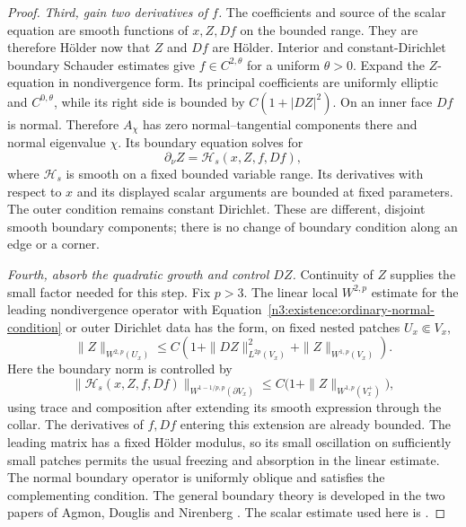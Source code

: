 \begin{proof}
\emph{Third, gain two derivatives of $f$.}
The coefficients and source of the scalar equation are smooth
functions of $x,Z,Df$ on the bounded range. They are therefore
H\"older now that $Z$ and $Df$ are H\"older.  Interior and constant-Dirichlet boundary Schauder
estimates give $f\in C^{2,\theta}$ for a uniform $\theta>0$.
Expand the $Z$-equation in nondivergence form.  Its principal
coefficients are uniformly elliptic and $C^{0,\theta}$, while its
right side is bounded by $C(1+|DZ|^2)$.
On an inner face $Df$ is normal.  Therefore $A_\chi$ has zero
normal--tangential components there and normal eigenvalue $\chi$.
Its boundary equation solves for
\begin{equation}\label{n3:existence:ordinary-normal-condition}
 \partial_\nu Z=\mathcal H_s(x,Z,f,Df),
\end{equation}
where $\mathcal H_s$ is smooth on a fixed bounded variable range.
Its derivatives with respect to $x$ and its displayed scalar
arguments are bounded at fixed parameters.  The outer condition
remains constant Dirichlet.  These are different, disjoint smooth
boundary components; there is no change of boundary condition along
an edge or a corner.

\emph{Fourth, absorb the quadratic growth and control $DZ$.}
Continuity of $Z$ supplies the small factor needed for this step.
Fix $p>3$.  The linear local $W^{2,p}$ estimate for the leading
nondivergence operator with Equation~\eqref{n3:existence:ordinary-normal-condition}
or outer Dirichlet data has the form, on fixed nested patches
$U_x\Subset V_x$,
\begin{equation}\label{n3:existence:Wp-pre-absorption}
 \|Z\|_{W^{2,p}(U_x)}
 \le C\left(1+\|DZ\|_{L^{2p}(V_x)}^2
                 +\|Z\|_{W^{1,p}(V_x)}\right).
\end{equation}
Here the boundary norm is controlled by
\begin{equation}\label{n3:existence:boundary-trace-composition}
 \|\mathcal H_s(x,Z,f,Df)\|_{W^{1-1/p,p}(\partial V_x)}
 \le C\bigl(1+\|Z\|_{W^{1,p}(V_x^+)}\bigr),
\end{equation}
using trace and composition after extending its smooth expression
through the collar.  The derivatives of $f,Df$ entering this
extension are already bounded.  The leading matrix has a fixed
H\"older modulus, so its small oscillation on sufficiently small
patches permits the usual freezing and absorption in the linear
estimate.  The normal boundary operator is uniformly oblique and
satisfies the complementing condition. The general boundary theory is
developed in the two papers of Agmon, Douglis and Nirenberg
\cite{AgmonDouglisNirenberg1959,AgmonDouglisNirenberg1964}. The scalar
estimate used here is
\cite[Theorem~15.2, estimate~(15.5), p.~704]{AgmonDouglisNirenberg1959}.


\end{proof}
